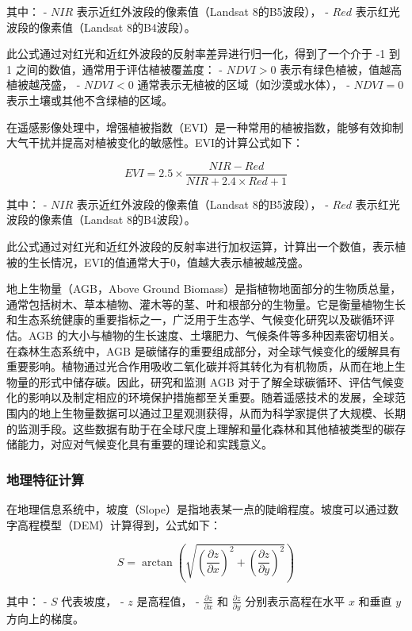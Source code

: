 \documentclass{article}
\begin{document}
		其中：
		- \( NIR \) 表示近红外波段的像素值（Landsat 8的B5波段），
		- \( Red \) 表示红光波段的像素值（Landsat 8的B4波段）。
		
		此公式通过对红光和近红外波段的反射率差异进行归一化，得到了一个介于 -1 到 1 之间的数值，通常用于评估植被覆盖度：
		- \( NDVI > 0 \) 表示有绿色植被，值越高植被越茂盛，
		- \( NDVI < 0 \) 通常表示无植被的区域（如沙漠或水体），
		- \( NDVI = 0 \) 表示土壤或其他不含绿植的区域。
		
		在遥感影像处理中，增强植被指数（EVI）是一种常用的植被指数，能够有效抑制大气干扰并提高对植被变化的敏感性。EVI的计算公式如下：
		
		\[
		EVI = 2.5 \times \frac{NIR - Red}{NIR + 2.4 \times Red + 1}
		\]
		
		其中：
		- \( NIR \) 表示近红外波段的像素值（Landsat 8的B5波段），
		- \( Red \) 表示红光波段的像素值（Landsat 8的B4波段）。
		
		此公式通过对红光和近红外波段的反射率进行加权运算，计算出一个数值，表示植被的生长情况，EVI的值通常大于0，值越大表示植被越茂盛。
		\par
		地上生物量（AGB，Above Ground Biomass）是指植物地面部分的生物质总量，通常包括树木、草本植物、灌木等的茎、叶和根部分的生物量。它是衡量植物生长和生态系统健康的重要指标之一，广泛用于生态学、气候变化研究以及碳循环评估。AGB 的大小与植物的生长速度、土壤肥力、气候条件等多种因素密切相关。在森林生态系统中，AGB 是碳储存的重要组成部分，对全球气候变化的缓解具有重要影响。植物通过光合作用吸收二氧化碳并将其转化为有机物质，从而在地上生物量的形式中储存碳。因此，研究和监测 AGB 对于了解全球碳循环、评估气候变化的影响以及制定相应的环境保护措施都至关重要。随着遥感技术的发展，全球范围内的地上生物量数据可以通过卫星观测获得，从而为科学家提供了大规模、长期的监测手段。这些数据有助于在全球尺度上理解和量化森林和其他植被类型的碳存储能力，对应对气候变化具有重要的理论和实践意义。
		\subsubsection{地理特征计算}
		
		在地理信息系统中，坡度（Slope）是指地表某一点的陡峭程度。坡度可以通过数字高程模型（DEM）计算得到，公式如下：
		
		\[
		S = \arctan \left( \sqrt{ \left( \frac{\partial z}{\partial x} \right)^2 + \left( \frac{\partial z}{\partial y} \right)^2 } \right)
		\]
		
		其中：
		- \( S \) 代表坡度，
		- \( z \) 是高程值，
		- \( \frac{\partial z}{\partial x} \) 和 \( \frac{\partial z}{\partial y} \) 分别表示高程在水平 \( x \) 和垂直 \( y \) 方向上的梯度。
\end{document}
